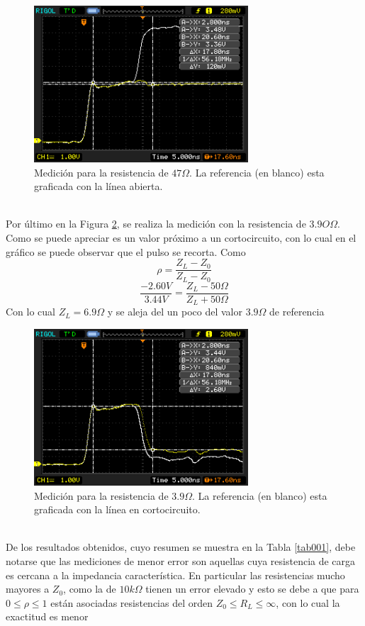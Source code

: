 \documentclass[a4paper,10pt]{article}
\begin{document}
		\begin{figure}[!htb]
			\centering
			\includegraphics[width=8cm]
			{Imagenes/Res47.png}
			\caption{Medici\'on para la resistencia de $47\Omega$. La referencia (en blanco) esta graficada con la l\'inea abierta.}
			\label{img004}
		\end{figure}\\
	Por \'ultimo en la Figura \ref{img005}, se realiza la medici\'on con la resistencia de $3.9O\Omega$. Como se puede apreciar es un valor pr\'oximo a un cortocircuito, con lo cual en el gr\'afico se puede observar que el pulso se recorta. Como $$\rho=\frac{Z_L-Z_0}{Z_L-Z_0}$$
	$$\frac{-2.60V}{3.44V}=\frac{Z_L- 50\Omega}{Z_L+50\Omega}$$
	Con lo cual $Z_L=6.9\Omega$ y se aleja del un poco del valor  $3.9\Omega$ de referencia
		\begin{figure}[!htb]
			\centering
			\includegraphics[width=8cm]
			{Imagenes/Res3e9.png}
			\caption{Medici\'on para la resistencia de $3.9\Omega$. La referencia (en blanco) esta graficada con la l\'inea en cortocircuito.}
			\label{img005}
		\end{figure}	\\	
	De los resultados obtenidos, cuyo resumen se muestra en la Tabla \ref{tab001}, debe notarse que las mediciones de menor error son aquellas cuya resistencia de carga es cercana a la impedancia caracter\'istica. En particular las resistencias  mucho mayores a $Z_0$, como la de $10k\Omega$ tienen un error elevado y esto se debe a que para $0\leq \rho \leq 1$ est\'an asociadas resistencias del orden $Z_0 \leq R_L \leq \infty$, con lo cual la exactitud es menor
	
\end{document}
